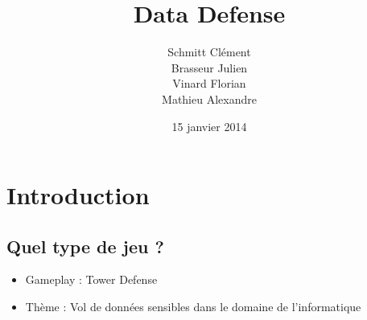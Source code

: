 \documentclass[usepdftitle=false]{beamer}
\title{Data Defense}
\author[Serious Game]{Schmitt Clément \\ Brasseur Julien \\ Vinard Florian \\ Mathieu Alexandre}
\institute{Université Montpellier II}
\date{15 janvier 2014}
\begin{document}
	\begin{frame}
		\titlepage
	\end{frame}
	
	\begin{frame}
		\tableofcontents[hideallsubsections]
	\end{frame}
	
	\section{Introduction}
	\subsection{Quel type de jeu ?}
	\begin{frame}
		\begin{itemize}
			\item Gameplay : Tower Defense
			\item Thème : Vol de données sensibles dans le domaine de l'informatique
		\end{itemize}
	\end{frame}
	
\end{document}
